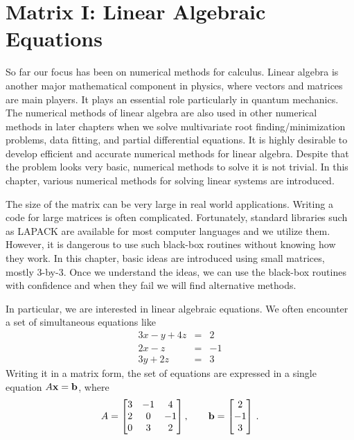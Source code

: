 \chapter{Matrix I: Linear Algebraic Equations}\label{eq:matrix-linear}
  
So far our focus has been on numerical methods for calculus. Linear algebra is another major mathematical component in physics, where vectors and matrices are main players. It plays an essential role particularly in quantum mechanics. The numerical methods of linear algebra are also used in other numerical methods in later chapters when we solve multivariate root finding/minimization problems, data fitting, and partial differential equations. It is highly desirable to develop efficient and accurate numerical methods for linear algebra.  Despite that the problem looks very basic, numerical methods to solve it is not trivial. 
In this chapter, various numerical methods for solving linear systems are introduced.

The size of the matrix can be very large in real world applications. Writing a code for large matrices is often complicated.  Fortunately, standard libraries such as LAPACK\cite{lapack} are available for most computer languages and we utilize them.  However, it is dangerous to use such black-box routines without knowing how they work.  In this chapter, basic ideas are introduced using small matrices, mostly 3-by-3.  Once we understand the ideas, we can use the black-box routines with confidence and when they fail we will find alternative methods.

In particular, we are interested in linear algebraic equations.  We often encounter a set of simultaneous equations like 
\begin{subequations} \label{eq:3x3_1}
\begin{eqnarray}
3 x - y + 4 z &=& 2  \label{eq:3x3_1a}\\
2 x -z &=& -1 \label{eq:3x3_1b}\\
3 y + 2z &=&  3\label{eq:3x3_1c}
\end{eqnarray}
\end{subequations}
Writing it in a matrix form, the set of equations are expressed in a single equation  $A \vb{x} = \vb{b}$, where
\begin{equation}\label{eq:3x3_matrix}
A = \begin{bmatrix}
3 & -1 & 4 \\ 2 & 0 & -1 \\ 0 & 3 & 2
\end{bmatrix}
, \qquad
\vb{b}=
\begin{bmatrix}
2 \\ -1 \\ 3
\end{bmatrix}\, .
\end{equation}


